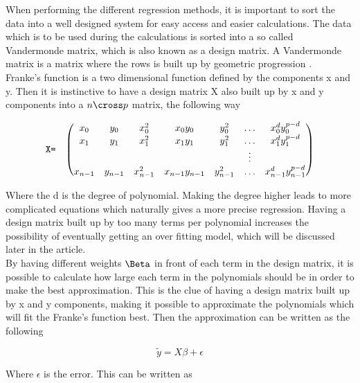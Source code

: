 \documentclass[../main.tex]{subfiles}
\begin{document}
When performing the different regression methods, it is important to sort the data into a well designed system for easy access and easier calculations. The data which is to be used during the calculations is sorted into a so called Vandermonde matrix, which is also known as a design matrix. A Vandermonde matrix is a matrix where the rows is built up by geometric progression \cite{vandermonde}.\\

Franke's function is a two dimensional function defined by the components x and y. Then it is instinctive to have a design matrix X also built up by x and y components into a $n\cross p$ matrix, the following way

\[
\begin{array}{lcccccc}
  \verb|X=| & \left(\begin{array}{@{}ccccccc@{}}
    x_0 & y_0 & x_0^2 & x_0y_0 & y_0^2 & \ldots & x_0^d y_0^{p-d}\\
    x_1 & y_1 & x_1^2 & x_1y_1 & y_1^2 & \ldots & x_1^d y_1^{p-d}\\
     &  &  &  &  & \vdots & \\
    x_{n-1} & y_{n-1} & x_{n-1}^2 & x_{n-1}y_{n-1} & y_{n-1}^2 & \ldots & x_{n-1}^d y_{n-1}^{p-d}\\
 \end{array}\right) \\[15pt]
\end{array}
\]

Where the d is the degree of polynomial. Making the degree higher leads to more complicated equations which naturally gives a more precise regression. Having a design matrix built up by too many terms per polynomial increases the possibility of eventually getting an over fitting model, which will be discussed later in the article.\\

By having different weights $\Beta$ in front of each term in the design matrix, it is possible to calculate how large each term in the polynomials should be in order to make the best approximation. This is the clue of having a design matrix built up by x and y components, making it possible to approximate the polynomials which will fit the Franke's function best. Then the approximation can be written as the following

\begin{equation}
    \tilde{y}=X\beta+\epsilon
\end{equation}

Where $\epsilon$ is the error. This can be written as
\end{document}
